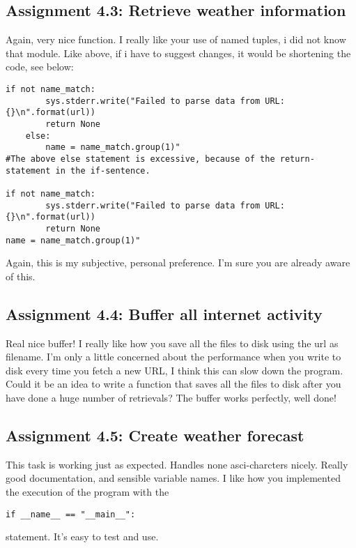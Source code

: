 \documentclass[a4paper]{article}
\begin{document}
\subsection*{Assignment 4.3: Retrieve weather information}
Again, very nice function. I really like your use of named tuples, i did not know that module.
Like above, if i have to suggest changes, it would be shortening the code, see below:

\begin{verbatim}
if not name_match:
        sys.stderr.write("Failed to parse data from URL: {}\n".format(url))
        return None
    else:
        name = name_match.group(1)"
#The above else statement is excessive, because of the return-statement in the if-sentence.

if not name_match:
        sys.stderr.write("Failed to parse data from URL: {}\n".format(url))
        return None
name = name_match.group(1)"
\end{verbatim}
\newline
Again, this is my subjective, personal preference. I'm sure you are already aware of this.

\subsection*{Assignment 4.4: Buffer all internet activity}
Real nice buffer! I really like how you save all the files to disk using the url as filename. I'm only a little concerned about the performance when you write to disk every time you fetch a new URL, I think this can slow down the program. Could it be an idea to write a function that saves all the files to disk after you have done a huge number of retrievals?
\newline
The buffer works perfectly, well done!



\subsection*{Assignment 4.5: Create weather forecast}
This task is working just as expected. Handles none asci-charcters nicely. Really good documentation, and sensible variable names. I like how you implemented the execution of the program with the \newline
\begin{verbatim}
if __name__ == "__main__":
\end{verbatim}
statement. It's easy to test and use.
\end{document}
